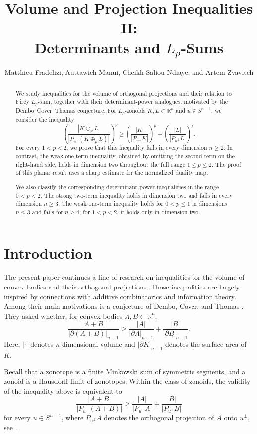 \documentclass[11pt,a4paper]{amsart}
\title[Volume and Projection Inequalities II]{Volume and Projection Inequalities II:\\ Determinants and $L_p$-Sums}
\author[M. Fradelizi, A. Manui, C. S. Ndiaye, and A. Zvavitch]{Matthieu Fradelizi,  Auttawich Manui,
Cheikh Saliou Ndiaye, and Artem Zvavitch}
\date{}
\theoremstyle{plain}
\theoremstyle{definition}
\begin{document}
\begin{abstract}
We study  inequalities  for the volume of orthogonal projections and their relation to  Firey 
$L_p$-sum, together with their determinant-power analogues, motivated
by the Dembo--Cover--Thomas conjecture. For $L_p$-zonoids $K,L\subset\mathbb{R}^n$ and $u\in S^{n-1}$,
we consider the inequality
\[
\left(
\frac{|K\oplus_p L|}
     {|P_{u^\perp}(K\oplus_p L)|}
\right)^p
\geq
\left(
\frac{|K|}{|P_{u^\perp}K|}
\right)^p
+
\left(
\frac{|L|}{|P_{u^\perp}L|}
\right)^p .
\]
For every $1<p<2$, we prove that this inequality fails in every
dimension $n\geq2$. In contrast, the weak one-term inequality,
obtained by omitting the second term on the right-hand side, holds in
dimension two throughout the full range $1\leq p\leq2$. The proof of
this planar result uses a sharp estimate for the normalized
duality map.

We also classify the corresponding determinant-power inequalities in
the range $0<p<2$. The strong two-term inequality holds in dimension
two and fails in every dimension $n\geq3$. The weak one-term
inequality holds for $0<p\leq1$ in dimensions $n\leq3$ and fails
for $n\geq4$; for $1<p<2$, it holds only in dimension two.
\end{abstract}

\maketitle
\tableofcontents

\section{Introduction}


The present paper continues a line of research on inequalities for the volume of convex bodies and their orthogonal projections. Those inequalities are largely 
 inspired by connections with additive combinatorics and
information theory. Among their main motivations is a conjecture of
Dembo, Cover, and Thomas \cite{DCT-91}. They asked whether, for convex
bodies \(A,B\subset\mathbb{R}^n\),
\begin{equation}\label{conj:DCT}
\frac{|A+B|}{|\partial(A+B)|_{n-1}}
\geq
\frac{|A|}{|\partial A|_{n-1}}
+
\frac{|B|}{|\partial B|_{n-1}}.
\end{equation}
Here, \(|\cdot|\) denotes \(n\)-dimensional volume and
\(|\partial K|_{n-1}\) denotes the surface area of \(K\).

Recall that a zonotope is a finite Minkowski sum of symmetric
segments, and a zonoid is a Hausdorff limit of zonotopes. Within the
class of zonoids, the validity of the inequality above is equivalent
to
\begin{equation}\label{conj:str-zonoid}
\frac{|A+B|}{|P_{u^\perp}(A+B)|}
\geq
\frac{|A|}{|P_{u^\perp}A|}
+
\frac{|B|}{|P_{u^\perp}B|}
\end{equation}
for every \(u\in S^{n-1}\), where \(P_{u^\perp}A\) denotes the
orthogonal projection of \(A\) onto \(u^\perp\), see \cite[Remark~3.10]{FMMZ-24}.
\end{document}
